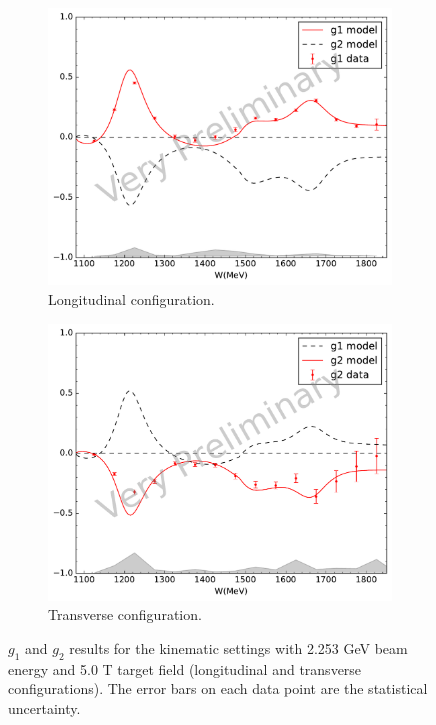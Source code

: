 \begin{figure}[p!]
  \centering
  \begin{subfigure}[t]{0.79\textwidth}
    \includegraphics[width=\textwidth]{figs/g1g2-model-22535000.pdf}
    \caption{Longitudinal configuration. \label{C8S4F1a}}
  \end{subfigure}
  \begin{subfigure}[t]{0.79\textwidth}
    \includegraphics[width=\textwidth]{figs/g1g2-model-22535090.pdf}
    \caption{Transverse configuration. \label{C8S4F1b}}
  \end{subfigure}
  \caption[$g_1$ and $g_2$ results with $E=2.253$ GeV and $B=5.0$ T.]{$g_1$ and $g_2$ results for the kinematic settings with 2.253 GeV beam energy and 5.0 T target field (longitudinal and transverse configurations). The error bars on each data point are the statistical uncertainty. \label{C8S4F1}}
\end{figure}

